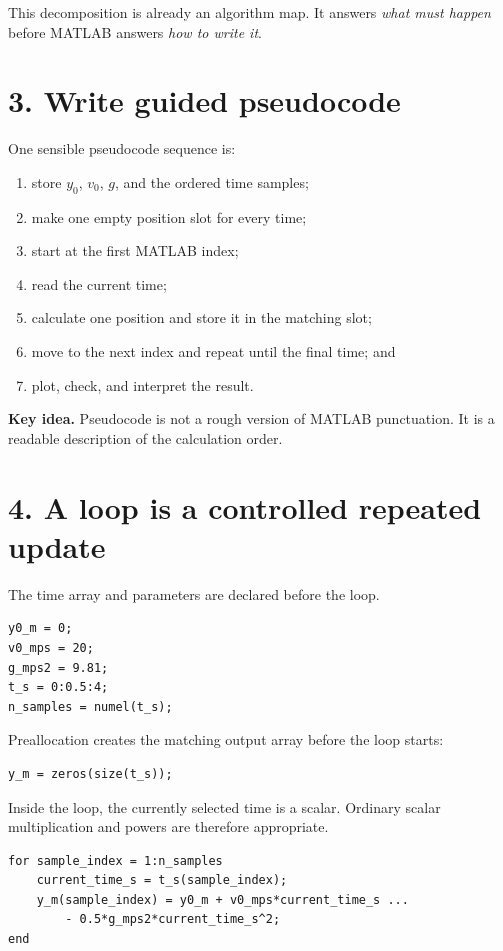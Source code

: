 \documentclass[11pt,a4paper]{article}
\begin{document}
This decomposition is already an algorithm map. It answers \emph{what must happen} before MATLAB answers \emph{how to write it}.

\section*{3. Write guided pseudocode}
One sensible pseudocode sequence is:
\begin{enumerate}[nosep,leftmargin=7mm]
\item store $y_0$, $v_0$, $g$, and the ordered time samples;
\item make one empty position slot for every time;
\item start at the first MATLAB index;
\item read the current time;
\item calculate one position and store it in the matching slot;
\item move to the next index and repeat until the final time; and
\item plot, check, and interpret the result.
\end{enumerate}

\begin{keybox}\textbf{Key idea.} Pseudocode is not a rough version of MATLAB punctuation. It is a readable description of the calculation order.\end{keybox}

\section*{4. A loop is a controlled repeated update}
The time array and parameters are declared before the loop.
\begin{lstlisting}[style=matlabstyle,caption={Model values and time array used in this example}]
y0_m = 0;
v0_mps = 20;
g_mps2 = 9.81;
t_s = 0:0.5:4;
n_samples = numel(t_s);
\end{lstlisting}

Preallocation creates the matching output array before the loop starts:
\begin{lstlisting}[style=matlabstyle,caption={Preallocate one storage slot per time sample}]
y_m = zeros(size(t_s));
\end{lstlisting}

Inside the loop, the currently selected time is a scalar. Ordinary scalar multiplication and powers are therefore appropriate.
\begin{lstlisting}[style=matlabstyle,caption={One position is calculated and stored on each pass}]
for sample_index = 1:n_samples
    current_time_s = t_s(sample_index);
    y_m(sample_index) = y0_m + v0_mps*current_time_s ...
        - 0.5*g_mps2*current_time_s^2;
end
\end{lstlisting}
\end{document}
